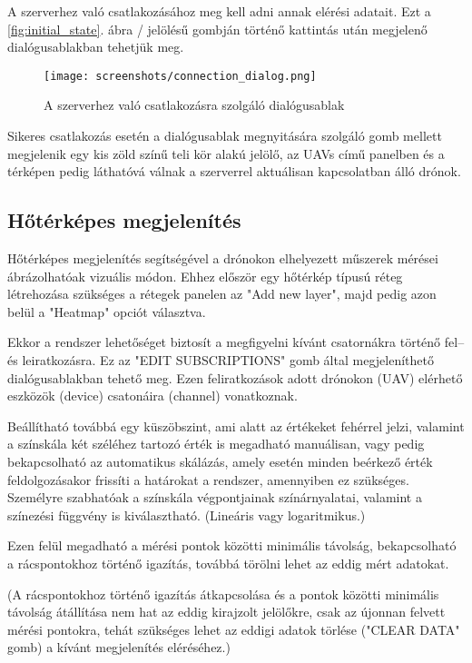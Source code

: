 A szerverhez való csatlakozásához meg kell adni annak elérési adatait. Ezt a
\ref{fig:initial_state}. ábra / jelölésű gombján történő kattintás
után megjelenő dialógusablakban tehetjük meg.

\begin{figure}[H]
  \center
  \texttt{[image: screenshots/connection\_dialog.png]}
  \caption{A szerverhez való csatlakozásra szolgáló dialógusablak}
  \label{fig:connection_dialog}
\end{figure}

Sikeres csatlakozás esetén a dialógusablak megnyitására szolgáló gomb mellett
megjelenik egy kis zöld színű teli kör alakú jelölő, az UAVs című panelben és a
térképen pedig láthatóvá válnak a szerverrel aktuálisan kapcsolatban álló
drónok.


\subsection{Hőtérképes megjelenítés}

Hőtérképes megjelenítés segítségével a drónokon elhelyezett műszerek mérései
ábrázolhatóak vizuális módon. Ehhez először egy hőtérkép típusú réteg
létrehozása szükséges a rétegek panelen az "Add new layer", majd pedig azon
belül a "Heatmap" opciót választva.

Ekkor a rendszer lehetőséget biztosít a megfigyelni kívánt csatornákra történő
fel-- és leiratkozásra. Ez az "EDIT SUBSCRIPTIONS" gomb által megjeleníthető
dialógusablakban tehető meg. Ezen feliratkozások adott drónokon (UAV) elérhető
eszközök (device) csatonáira (channel) vonatkoznak.

Beállítható továbbá egy küszöbszint, ami alatt az értékeket fehérrel jelzi,
valamint a színskála két széléhez tartozó érték is megadható manuálisan, vagy
pedig bekapcsolható az automatikus skálázás, amely esetén minden beérkező érték
feldolgozásakor frissíti a határokat a rendszer, amennyiben ez szükséges.
Személyre szabhatóak a színskála végpontjainak színárnyalatai, valamint a
színezési függvény is kiválasztható. (Lineáris vagy logaritmikus.)

Ezen felül megadható a mérési pontok közötti minimális távolság, bekapcsolható a
rácspontokhoz történő igazítás, továbbá törölni lehet az eddig mért adatokat.

(A rácspontokhoz történő igazítás átkapcsolása és a pontok közötti minimális
távolság átállítása nem hat az eddig kirajzolt jelölőkre, csak az újonnan
felvett mérési pontokra, tehát szükséges lehet az eddigi adatok törlése ("CLEAR
DATA" gomb) a kívánt megjelenítés eléréséhez.)

